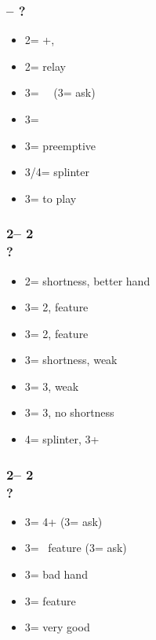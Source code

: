 \documentclass[12pt, a4paper]{report}
\begin{document}
{{{            \subsubsection*{\alrts{2\hearts} -- ?}
            \begin{itemize}
                \item 2\spades = +, \fton{3\major}
                \item 2\nt = relay
                \item 3\clubs = \minor\ \gf\ (3\diams = ask)
                \item 3\diams = \hearts\ \invp
                \item 3\hearts = preemptive
                \item 3\spades/4\minor = splinter
                \item 3\nt = to play
            \end{itemize}

            \subsubsection*{2\hearts -- 2\spades\\
                            ?}
            \begin{itemize}
                \item 2\nt = \spades shortness, better hand
                \item 3\clubs = 2\spades, \clubs feature
                \item 3\diams = 2\spades, \diams feature
                \item 3\hearts = \spades shortness, weak
                \item 3\spades = 3\spades, weak
                \item 3\nt = 3\spades, no shortness
                \item 4\minor = splinter, 3+\spades
            \end{itemize}

            \subsubsection*{2\hearts -- 2\nt\\
                            ?}
            \begin{itemize}
                \item 3\clubs = 4+\twosuit{\minor}{\spades} (3\diams = ask)
                \item 3\diams = \minor\ feature (3\hearts = ask)
                \item 3\hearts = bad hand
                \item 3\spades = \spades feature
                \item 3\nt = very good \hearts
            \end{itemize}

}}}
\end{document}
